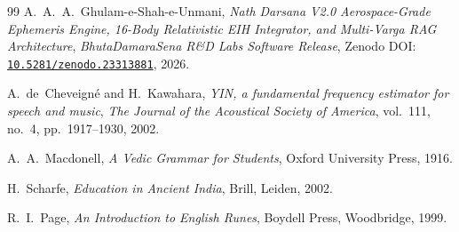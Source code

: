\documentclass[11pt,a4paper,reqno]{article}
\newcommand{\zenodo}[1]{\href{https://doi.org/10.5281/zenodo.#1}{\nolinkurl{10.5281/zenodo.#1}}}
\theoremstyle{plain}
\theoremstyle{definition}
\theoremstyle{remark}
\numberwithin{equation}{section}
\begin{document}
\begin{thebibliography}{99}
A.~A.~A.~Ghulam-e-Shah-e-Unmani,
\emph{Nath Darsana V2.0 Aerospace-Grade Ephemeris Engine, 16-Body Relativistic EIH Integrator, and Multi-Varga RAG Architecture},
\emph{BhutaDamaraSena R\&D Labs Software Release}, Zenodo DOI: \zenodo{23313881}, 2026.

A.~de~Cheveign{\'e} and H.~Kawahara,
\emph{YIN, a fundamental frequency estimator for speech and music},
\emph{The Journal of the Acoustical Society of America}, vol.~111, no.~4, pp.~1917--1930, 2002.

A.~A.~Macdonell,
\emph{A Vedic Grammar for Students},
Oxford University Press, 1916.

H.~Scharfe,
\emph{Education in Ancient India},
Brill, Leiden, 2002.

R.~I.~Page,
\emph{An Introduction to English Runes},
Boydell Press, Woodbridge, 1999.

\end{thebibliography}
\end{document}
